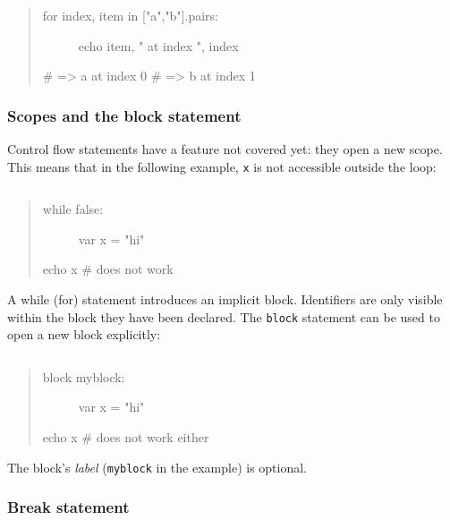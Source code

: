 \begin{quote}
\begin{description}
\item[for index, item in {[}"a","b"{]}.pairs:]
echo item, " at index ", index
\end{description}

\# =\textgreater{} a at index 0 \# =\textgreater{} b at index 1
\end{quote}

\hypertarget{scopes-and-the-block-statement}{%
\subsubsection{Scopes and the block
statement}\label{scopes-and-the-block-statement}}

Control flow statements have a feature not covered yet: they open a new
scope. This means that in the following example, \texttt{x} is not
accessible outside the loop:

\begin{verbatim}
\end{verbatim}

\begin{quote}
\begin{description}
\item[while false:]
var x = "hi"
\end{description}

echo x \# does not work
\end{quote}

A while (for) statement introduces an implicit block. Identifiers are
only visible within the block they have been declared. The
\texttt{block} statement can be used to open a new block explicitly:

\begin{verbatim}
\end{verbatim}

\begin{quote}
\begin{description}
\item[block myblock:]
var x = "hi"
\end{description}

echo x \# does not work either
\end{quote}

The block's \emph{label} (\texttt{myblock} in the example) is optional.

\hypertarget{break-statement}{%
\subsubsection{Break statement}\label{break-statement}}


